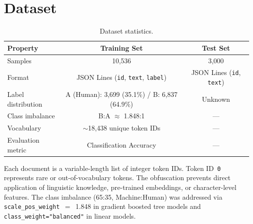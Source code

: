 \documentclass[11pt]{article}
\begin{document}

\section{Dataset}

\begin{table}[h!]
\centering
\caption{Dataset statistics.}
\label{tab:dataset}
\small
\begin{tabular}{@{}lcc@{}}
\toprule
\textbf{Property} & \textbf{Training Set} & \textbf{Test Set} \\
\midrule
Samples & 10,536 & 3,000 \\
Format & JSON Lines (\texttt{id}, \texttt{text}, \texttt{label}) & JSON Lines (\texttt{id}, \texttt{text}) \\
Label distribution & A (Human): 3,699 (35.1\%) / B: 6,837 (64.9\%) & Unknown \\
Class imbalance & B:A $\approx$ 1.848:1 & --- \\
Vocabulary & $\sim$18,438 unique token IDs & --- \\
Evaluation metric & Classification Accuracy & --- \\
\bottomrule
\end{tabular}
\end{table}

Each document is a variable-length list of integer token IDs. Token ID~\texttt{0} represents rare or out-of-vocabulary tokens. The obfuscation prevents direct application of linguistic knowledge, pre-trained embeddings, or character-level features. The class imbalance (65:35, Machine:Human) was addressed via \texttt{scale\_pos\_weight}~$=$~1.848 in gradient boosted tree models and \texttt{class\_weight="balanced"} in linear models.
\end{document}
